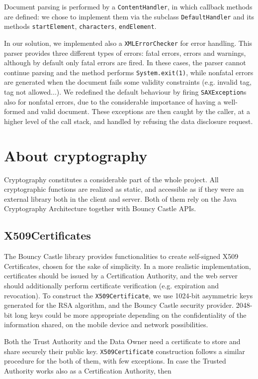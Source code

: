 Document parsing is performed by a \texttt{ContentHandler}, in which callback methods are defined: we chose to implement them via the subclass \texttt{DefaultHandler} and its methods \texttt{startElement}, \texttt{characters}, \texttt{endElement}.

In our solution, we implemented also a \texttt{XMLErrorChecker} for error handling. This parser provides three different types of errors: fatal errors, errors and warnings, although by default only fatal errors are fired. In these cases, the parser cannot continue parsing and the method performs \texttt{System.exit(1)}, while nonfatal errors are generated when the document fails some validity constraints (e.g. invalid tag, tag not allowed...). We redefined the default behaviour by firing \texttt{SAXException}s also for nonfatal errors, due to the considerable importance of having a well-formed and valid document. These exceptions are then caught by the caller, at a higher level of the call stack, and handled by refusing the data disclosure request.


\section{About cryptography}
Cryptography constitutes a considerable part of the whole project. All cryptographic functions are realized as static, and accessible as if they were an external library both in the client and server. Both of them rely on the Java Cryptography Architecture together with Bouncy Castle APIs.

\subsection{X509Certificates}
The Bouncy Castle library provides functionalities to create self-signed X509 Certificates, chosen for the sake of simplicity. In a more realistic implementation, certificates should be issued by a Certification Authority, and the web server should additionally perform certificate verification (e.g. expiration and revocation). To construct the \texttt{X509Certificate}, we use 1024-bit asymmetric keys generated for the RSA algorithm, and the Bouncy Castle security provider. 2048-bit long keys could be more appropriate depending on the confidentiality of the information shared, on the mobile device and network possibilities.

Both the Trust Authority and the Data Owner need a certificate to store and share securely their public key. \texttt{X509Certificate} construction follows a similar procedure for the both of them, with few exceptions. In case the Trusted Authority works also as a Certification Authority, then 

